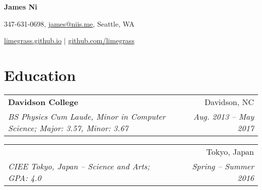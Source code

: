 \documentclass[letterpaper,11pt]{article}
\makeatletter
\newcommand{\resumeItem}[2]{
    \vspace{-2pt}
    \item\small{
        \textbf{#1}{ #2 \vspace{-2pt}}
    }
}
\newcommand{\resumeSubheading}[4]{
        \begin{tabular*}{0.97\textwidth}{l@{\extracolsep{\fill}}r}
            \textbf{#1} & #2 \\
            \textit{\small#3} & \textit{\small #4} \\
        \end{tabular*}
}
\newcommand{\resumeSubHeadingListStart}{}
\newcommand{\resumeSubHeadingListEnd}{}
\newcommand{\resumeItemListStart}{\begin{itemize}}
\newcommand{\resumeItemListEnd}{\end{itemize}}
\def\Cplusplus{C\raisebox{0.5ex}{\tiny\textbf{++}}}
\makeatother
\begin{document}

\begin{center}
    \LARGE{\textbf{James Ni}}

    \normalsize347-631-0698, \href{mailto:james@niis.me}{james@niis.me}, Seattle, WA

    \normalsize\href{https://limegrass.github.io}{limegrass.github.io} $\vert$ \normalsize\href{http://github.com/limegrass}{github.com/limegrass}
\end{center}


\section{\textbf{Education}}
    \resumeSubHeadingListStart
        \resumeSubheading
            {Davidson College}{Davidson, NC}
                {BS Physics Cum Laude, Minor in Computer Science; Major: 3.57, Minor: 3.67}{Aug. 2013 -- May 2017}
        \resumeSubheading
            {Sophia University \begin{CJK}{UTF8}{min}(上智大学)\end{CJK} }{Tokyo, Japan}
            {CIEE Tokyo, Japan -- Science and Arts; GPA: 4.0}{Spring -- Summer 2016}
    \resumeSubHeadingListEnd
\end{document}
